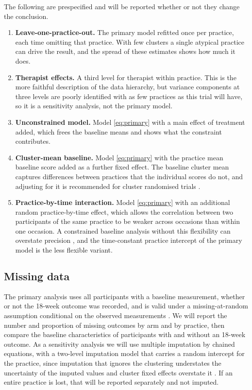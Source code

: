 \documentclass[11pt,a4paper]{article}
\begin{document}
The following are prespecified and will be reported whether or not they change
the conclusion.

\begin{enumerate}[leftmargin=1.4em, itemsep=2pt]
\item \textbf{Leave-one-practice-out.} The primary model refitted once per
practice, each time omitting that practice. With few clusters a single
atypical practice can drive the result, and the spread of these estimates
shows how much it does.
\item \textbf{Therapist effects.} A third level for therapist within practice.
This is the more faithful description of the data hierarchy, but variance
components at three levels are poorly identified with as few practices as
this trial will have, so it is a sensitivity analysis, not the primary model.
\item \textbf{Unconstrained model.} Model \eqref{eq:primary} with a main
effect of treatment added, which frees the baseline means and shows what the
constraint contributes.
\item \textbf{Cluster-mean baseline.} Model \eqref{eq:primary} with the
practice mean baseline score added as a further fixed effect. The baseline
cluster mean captures differences between practices that the individual
scores do not, and adjusting for it is recommended for cluster randomised
trials \citep{klar2004, hooper2018}.
\item \textbf{Practice-by-time interaction.} Model \eqref{eq:primary} with an
additional random practice-by-time effect, which allows the correlation
between two participants of the same practice to be weaker across occasions
than within one occasion. A constrained baseline analysis without this
flexibility can overstate precision \citep{hooper2016, martin2016,
hooper2018}, and the time-constant practice intercept of the primary model
is the less flexible variant.
\end{enumerate}

\subsection{Missing data}

The primary analysis uses all participants with a baseline measurement,
whether or not the 18-week outcome was recorded, and is valid under a
missing-at-random assumption conditional on the observed measurements
\citep{bell2020}. We will report the number and proportion of
missing outcomes by arm and by practice, then compare the baseline
characteristics of participants with and without an 18-week outcome. As a
sensitivity analysis we will use multiple imputation by chained equations,
with a two-level imputation model that carries a random intercept for the
practice, since imputation that ignores the clustering understates the
uncertainty of the imputed values and cluster fixed effects overstate it
\citep{andridge2011}. If an entire practice is lost, that will be
reported separately and not imputed.
\end{document}
